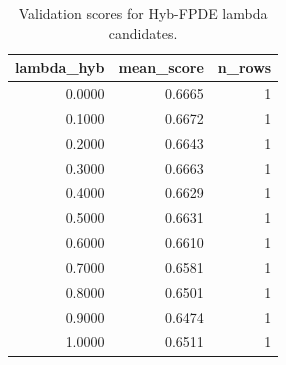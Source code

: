 \begin{table}[t]
\caption{Validation scores for Hyb-FPDE lambda candidates.}
\label{tab:lambda_distribution_computed}
\centering
\begin{tabular}{rrr}
\toprule
lambda\_hyb & mean\_score & n\_rows \\
\midrule
0.0000 & 0.6665 & 1 \\
0.1000 & 0.6672 & 1 \\
0.2000 & 0.6643 & 1 \\
0.3000 & 0.6663 & 1 \\
0.4000 & 0.6629 & 1 \\
0.5000 & 0.6631 & 1 \\
0.6000 & 0.6610 & 1 \\
0.7000 & 0.6581 & 1 \\
0.8000 & 0.6501 & 1 \\
0.9000 & 0.6474 & 1 \\
1.0000 & 0.6511 & 1 \\
\bottomrule
\end{tabular}

\end{table}
